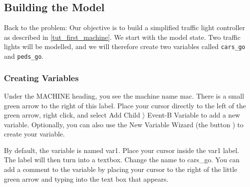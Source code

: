 \subsection{Building the Model}
\label{tut_building_the_model}

Back to the problem: Our objective is to build a simplified traffic light controller as described in \ref{tut_first_machine}.  We start with the model state.  Two traffic lights will be modelled, and we will therefore create two variables called  \texttt{cars\_go} and \texttt{peds\_go}.  

\subsubsection{Creating Variables}

Under the \textsf{MACHINE} heading, you see the machine name \textsf{mac}. There is a small green arrow to the right of this label. Place your cursor directly to the left of the green arrow, right click, and select \textsf{Add Child $\rangle$ Event-B Variable} to add a new variable. Optionally, you can also use the New Variable Wizard (the button ) to create your variable. 

By default, the variable is named \textsf{var1}. Place your cursor inside the \textsf{var1} label. The label will then turn into a textbox. Change the name to \textsf{cars\_go}. You can add a comment to the variable by placing your cursor to the right of the little green arrow and typing into the text box that appears.




